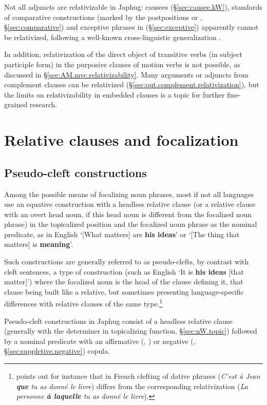 Not all adjuncts are relativizable in Japhug: causees (§\ref{sec:causee.kW}), standards of comparative constructions (marked by the postpositions  or , §\ref{sec:comparative}) and exceptive phrases in   (§\ref{sec:exceptive}) apparently cannot be relativized, following a well-known cross-linguistic generalization \citep{keenan77accessibility}.

In addition,  relativization of the direct object of transitive verbs (in subject participle form) in the purposive clauses of motion verbs is not possible, as discussed in §\ref{sec:AM.mvc.relativizability}. Many  arguments or adjuncts from complement clauses can be relativized (§\ref{sec:out.complement.relativization}), but the limits on relativizability in embedded clauses is a topic for further fine-grained research.


\section{Relative clauses and focalization}

\subsection{Pseudo-cleft constructions} \label{sec:pseudo.cleft}
Among the possible means of focalizing noun phrases, most if not all languages use an equative construction with a headless relative clause (or a relative clause with an overt head noun, if this head noun is different from the focalized noun phrase) in the topicalized position and the focalized noun phrase as the nominal predicate, as in English `[What matters] are \textbf{his ideas}' or `[The thing that matters] is \textbf{meaning}'.

Such constructions are generally referred to as pseudo-clefts, by contrast with cleft sentences, a type of construction (such as English `It is \textbf{his ideas} [that matter]') where the focalized noun is the head of the clause defining it, that clause being built like a relative, but sometimes presenting language-specific differences with relative clauses of the same type.\footnote{\citet[123--124]{creissels06sgit2} points out for instance that in French clefting of dative phrases (\textit{C'est à Jean \textbf{que} tu as donné le livre}) differs from the corresponding relativization (\textit{La personne \textbf{à laquelle} tu as donné le livre}).}

Pseudo-cleft constructions in Japhug consist of a headless relative clause (generally with the determiner  in topicalizing function, §\ref{sec:nW.topic}) followed by a nominal predicate with an affirmative (, ) or negative (, §\ref{sec:suppletive.negative}) copula. 

